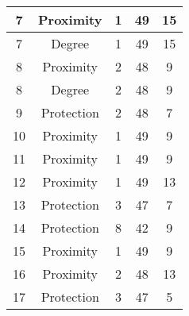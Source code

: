 \documentclass[results.tex]{subfiles}
\begin{document}
\begin{center}
\begin{tabular}{| c || c | c | c | c |}
            \hline
            7                       & Proximity                    & 1                      & 49                      & 15                   \\
            \hline
            7                       & Degree                       & 1                      & 49                      & 15                   \\
            \hline
            8                       & Proximity                    & 2                      & 48                      & 9                    \\
            \hline
            8                       & Degree                       & 2                      & 48                      & 9                    \\
            \hline
            9                       & Protection                   & 2                      & 48                      & 7                    \\
            \hline
            10                      & Proximity                    & 1                      & 49                      & 9                    \\
            \hline
            11                      & Proximity                    & 1                      & 49                      & 9                    \\
            \hline
            12                      & Proximity                    & 1                      & 49                      & 13                   \\
            \hline
            13                      & Protection                   & 3                      & 47                      & 7                    \\
            \hline
            14                      & Protection                   & 8                      & 42                      & 9                    \\
            \hline
            15                      & Proximity                    & 1                      & 49                      & 9                    \\
            \hline
            16                      & Proximity                    & 2                      & 48                      & 13                   \\
            \hline
            17                      & Protection                   & 3                      & 47                      & 5                    \\

\end{tabular}
\end{center}
\end{document}
